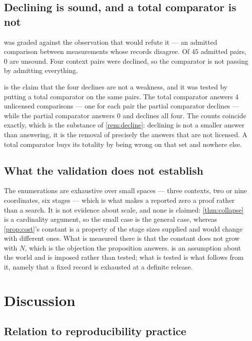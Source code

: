 \documentclass[11pt,a4paper]{article}
\theoremstyle{definition}
\theoremstyle{remark}
\begin{document}
\subsection{Declining is sound, and a total comparator is not}

 was graded against the observation that would
refute it --- an admitted comparison between measurements whose records
disagree. Of $45$ admitted pairs, $0$ are unsound. Four context pairs
were declined, so the comparator is not passing by admitting everything.

 is the claim that the four declines are not a
weakness, and it was tested by putting a total comparator on the same
pairs. The total comparator answers $4$ unlicensed comparisons --- one
for each pair the partial comparator declines --- while the partial
comparator answers $0$ and declines all four. The counts coincide
exactly, which is the substance of \cref{rem:decline}: declining is not
a smaller answer than answering, it is the removal of precisely the
answers that are not licensed. A total comparator buys its totality by
being wrong on that set and nowhere else.

\subsection{What the validation does not establish}

The enumerations are exhaustive over small spaces --- three contexts,
two or nine coordinates, six stages --- which is what makes a reported
zero a proof rather than a search. It is not evidence about scale, and
none is claimed: \cref{thm:collapse} is a cardinality argument, so the
small case is the general case, whereas \cref{prop:cost}'s constant is a
property of the stage sizes supplied and would change with different
ones. What is measured there is that the constant does not grow with
$N$, which is the objection the proposition answers.
 is an assumption about the world and is imposed
rather than tested; what is tested is what follows from it, namely that
a fixed record is exhausted at a definite release.

\section{Discussion}
\label{sec:discussion}

\subsection{Relation to reproducibility practice}
\end{document}
